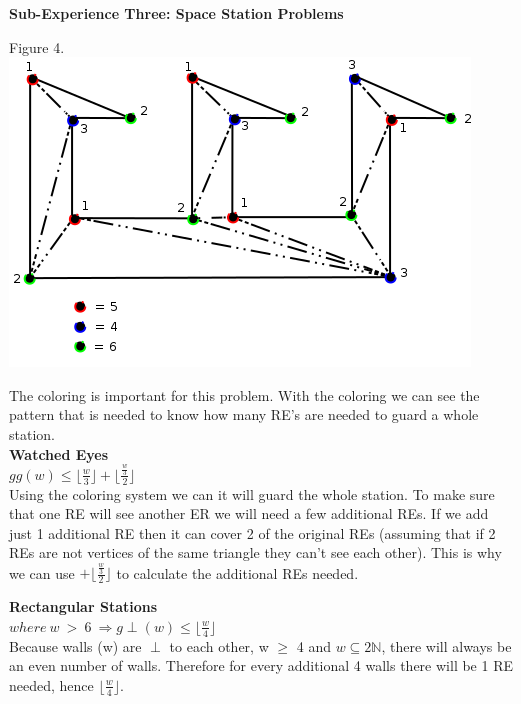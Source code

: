 \documentclass[10pt,a4paper]{report}
\begin{document}
		
	\textbf{Sub-Experience Three: Space Station Problems}\\
	
		\begin{center}
			Figure 4.\\
			\includegraphics[scale=.5]{e3.png}
			\newline
			\newline
		\end{center}
		
		The coloring is important for this problem.  With the coloring we can see the pattern that is needed to know how many RE's are needed to guard a whole station.\\
		
		\textbf{Watched Eyes}\\
		$gg(w) \leq \lfloor \frac{w}{3} \rfloor + \lfloor \frac{\frac{w}{3}}{2} \rfloor$\\
		Using the coloring system we can it will guard the whole station.  To make sure that one RE will see another ER we will need a few additional REs.  If we add just 1 additional RE then it can cover 2 of the original REs (assuming that if 2 REs are not vertices of the same triangle they can't see each other). This is why we can use $+ \lfloor \frac{\frac{w}{3}}{2} \rfloor$ to calculate the additional REs needed.  
		
		\textbf{Rectangular Stations}\\
		$where\ w\ >\ 6\ \Longrightarrow g\perp(w) \leq \lfloor \frac{w}{4} \rfloor$\\
		Because walls (w) are $\perp$ to each other, w $\geq$ 4 and $w \subseteq 2\mathbb{N}$, there will always be an even number of walls.  Therefore for every additional 4 walls there will be 1 RE needed, hence $\lfloor \frac{w}{4} \rfloor$.\\
		
\end{document}
